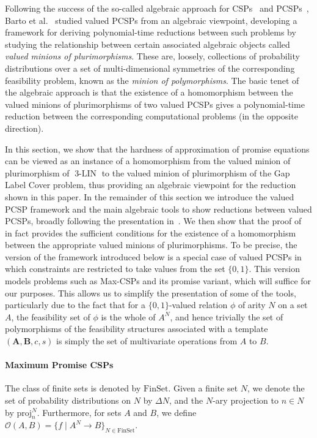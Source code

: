 \documentclass[a4paper,11pt]{article}
\theoremstyle{definition}
\newcommand{\proj}[2]{\mathrm{proj}^{#1}_{#2}}
\newcommand{\bfa}{\mathbf{A}}
\newcommand{\bfb}{\mathbf{B}}
\newcommand{\abcs}{(\bfa,\bfb,c,s)}
\newcommand{\eq}{\ensuremath{\operatorname{3-LIN}}}
\newcommand{\FinSet}{\mathrm{FinSet}}
\begin{document}
Following the success of the so-called  algebraic approach for
CSPs~\cite{JeavonsCG97,BulatovJK05} and PCSPs~\cite{BBKO21}, Barto et
al.~\cite{Barto24:lics} studied valued PCSPs from an algebraic viewpoint,
developing a framework for deriving polynomial-time reductions between such problems
by studying the relationship between certain associated algebraic objects called \emph{valued minions of plurimorphisms}. These are, loosely, collections of probability distributions over a set of multi-dimensional symmetries of the corresponding feasibility problem, known as the \emph{minion of polymorphisms}. The basic tenet of the algebraic approach is that the existence of a homomorphism between the valued minions of plurimorphisms of two valued PCSPs gives a polynomial-time reduction between the corresponding computational problems (in the opposite direction). 

\medskip
In this section, we show that the hardness of approximation of promise equations can be viewed as an instance of a homomorphism from the valued minion of plurimorphism of $\eq$ to the valued minion of plurimorphism of the Gap Label Cover problem, thus providing an algebraic viewpoint for the reduction shown in this paper.
%
In the remainder of this section we introduce the valued PCSP framework and the main algebraic tools to show reductions between valued PCSPs, broadly following the presentation in~\cite{Barto24:lics}. We then show that the proof of~ in fact provides the sufficient conditions for the existence of a homomorphism between the appropriate valued minions of plurimorphisms.
%
To be precise, the version of the framework introduced below is a special case
of valued PCSPs in which constraints are restricted to take values from the set
$\{0, 1\}$. This version models problems such as Max-CSPs and its promise
variant, which will suffice for our purposes.
This allows us to simplify the presentation of some of the tools, particularly
due to the fact that for a $\{0,1\}$-valued relation $\phi$ of arity $N$ on a
set $A$, the feasibility set of $\phi$ is the whole of $A^N$, and hence trivially the set of polymorphisms of the feasibility structures associated with a template $\abcs$ is simply the set of multivariate operations from $A$ to $B$. 

\paragraph{Maximum Promise CSPs}

The class of finite sets is denoted by $\FinSet$. Given a finite set $N$, we denote the set of probability distributions on $N$ by $\Delta N$, and the $N$-ary projection to $n\in N$ by $\proj{N}{n}$. Furthermore, for sets $A$ and $B$, we define $\mathscr{O}(A,B)=\{f \mid A^N\to B\}_{N \in \FinSet}$. 
\end{document}

